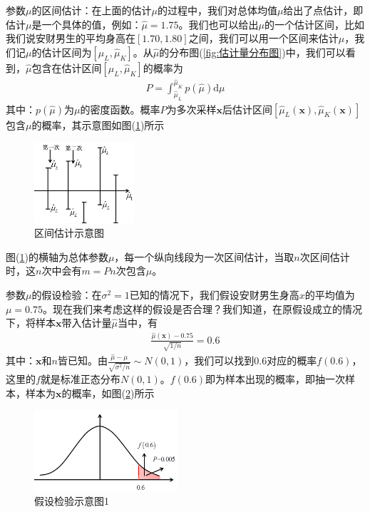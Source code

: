         \par
        参数$\mu$的区间估计：在上面的估计$\mu$的过程中，我们对总体均值$\mu$给出了点估计，即估计$\mu$是一个具体的值，例如：$\hat{\mu} = 1.75$。我们也可以给出$\mu$的一个估计区间，比如我们说安财男生的平均身高在$[1.70,1.80]$之间，我们可以用一个区间来估计$\mu$，我们记$\mu$的估计区间为$[\hat{\mu}_L,\hat{\mu}_K]$。从$\hat{\mu}$的分布图(\ref{fig:估计量分布图})中，我们可以看到，$\hat{\mu}$包含在估计区间$[\hat{\mu}_L,\hat{\mu}_K]$的概率为
        \begin{align*}
        P = \int_{\hat{\mu}_L}^{\hat{\mu}_K}p(\hat{\mu}) \mathrm{d}\mu
        \end{align*}
        其中：$p(\hat{\mu})$为$\mu$的密度函数。概率$P$为多次采样$\mathbf{x}$后估计区间$[\hat{\mu}_L(\mathbf{x}),\hat{\mu}_K(\mathbf{x})]$包含$\mu$的概率，其示意图如图(\ref{fig:区间估计示意图})所示
            \begin{figure}[H]
            \centering
            \includegraphics[height=3cm]{images/Interval_estimates.jpg}
            \caption{区间估计示意图}
            \label{fig:区间估计示意图}
            \end{figure}
        图(\ref{fig:区间估计示意图})的横轴为总体参数$\mu$，每一个纵向线段为一次区间估计，当取$n$次区间估计时，这$n$次中会有$m = Pn$次包含$\mu$。
        \par
        参数$\mu$的假设检验：在$\sigma^2 =1$已知的情况下，我们假设安财男生身高$x$的平均值为$\mu = 0.75$。现在我们来考虑这样的假设是否合理？我们知道，在原假设成立的情况下，将样本$\mathbf{x}$带入估计量$\hat{\mu}$当中，有
        \begin{align*}
        \frac{\hat{\mu}(\mathbf{x}) - 0.75}{\sqrt{1/n}} = 0.6
        \end{align*}
        其中：$\mathbf{x}$和$n$皆已知。由$\frac{\hat{\mu} - \mu}{\sqrt{\sigma^2/n}}\sim N(0,1)$，我们可以找到$0.6$对应的概率$f(0.6)$，这里的$f$就是标准正态分布$N(0,1)$。$f(0.6)$即为样本出现的概率，即抽一次样本，样本为$\mathbf{x}$的概率，如图(\ref{fig:假设检验示意图1})所示
            \begin{figure}[H]
            \centering
            \includegraphics[height=3cm]{images/hypothetical_test1.jpg}
            \caption{假设检验示意图1}
            \label{fig:假设检验示意图1}
            \end{figure}
